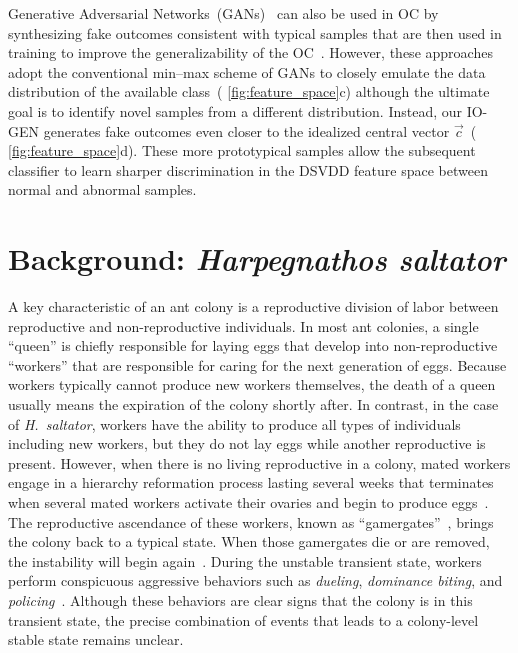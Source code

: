\documentclass[letterpaper]{article} %
\let\orgautoref\autoref
\renewcommand{\autoref}
{\def\equationautorefname{Equation}%
	\def\figureautorefname{Fig.}%
	\def\subfigureautorefname{Fig.}%
	\def\Itemautorefname{item}%
	\def\tableautorefname{Table}%
	\def\exerciseautorefname{Exercise}%
	\def\starexerciseautorefname{Exercise}%
	\def\sectionautorefname{Section}%
	\def\subsectionautorefname{Section}%
	\def\subsubsectionautorefname{Section}%
	\def\chapterautorefname{Section}%
	\def\partautorefname{Part}%
	\orgautoref}
\begin{document}
Generative Adversarial Networks~(GANs)~\citep{GPMXWOCB14} can also be
used in OC by synthesizing fake outcomes consistent with typical samples
that are then used in training to improve the generalizability of the
OC~\citep{SKFA18, YCR20, PNX19}. However, these approaches adopt the
conventional min--max scheme of GANs to closely emulate the data
distribution of the available class~(\autoref{fig:feature_space}c)
although the ultimate goal is to identify novel samples from a different
distribution. Instead, our \mbox{IO-GEN} generates fake outcomes even closer to
the idealized central vector $\vec{c}$~(\autoref{fig:feature_space}d).
These more prototypical samples allow the subsequent classifier to learn
sharper discrimination in the DSVDD feature space between normal and
abnormal samples.




\section{Background: \emph{Harpegnathos saltator}}
\label{sec:background}

A key characteristic of an ant colony is a reproductive division of
labor between reproductive and non-reproductive individuals.
In most ant colonies, a single ``queen'' is chiefly responsible for
laying eggs that develop into non-reproductive ``workers'' that
are responsible for caring for the next generation of eggs.
Because workers typically cannot produce
new workers themselves, the death of a queen usually means the
expiration of the colony shortly after.
In contrast, in the case of \emph{H.~saltator}, workers
have the ability to produce all types of individuals including new
workers,
but they do not lay eggs while another
reproductive is present. However, when there is no living reproductive
in a colony, mated workers engage in a hierarchy reformation process
lasting several weeks that terminates when several mated workers activate
their ovaries and begin to produce eggs~\citep{LPH99, SPSHPL16}. The
reproductive ascendance of these workers, known as
``gamergates''~\citep{PC85}, brings the colony back to a typical state.
When those gamergates die or are removed, the instability will begin
again~\citep{LPH99, SPSHPL16}.
During the unstable transient state, workers perform conspicuous aggressive
behaviors such as \emph{dueling}, \emph{dominance biting}, and
\emph{policing}~\citep{SPSHPL16}.
Although these behaviors are clear signs that the colony is in
this transient state, the precise combination of events that
leads to a colony-level stable state remains unclear.
\end{document}
